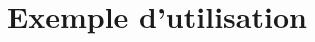 \documentclass[PhD,nohyperref,english,french]{ulthese}
\begin{document}
\frontmatter                    %

\pagetitre

\begin{SingleSpace}
\abnormalparskip{0pt}
\printglossary[title=Nomenclature]
\end{SingleSpace}
\cleardoublepage

\mainmatter                     %

\chapter{Exemple d'utilisation}

%
%
\end{document}
